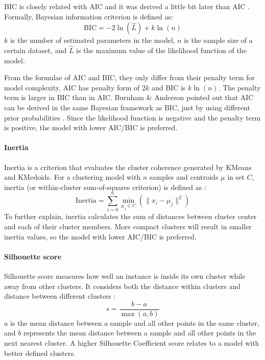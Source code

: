 \documentclass[a4paper]{article}
\begin{document}
BIC is closely related with AIC and it was derived a little bit later than AIC \cite{BIC}. Formally, Bayesian information criterion is defined as:
\begin{equation}
    \text{BIC}=-2\ln(\hat{L})+k\ln(n)
    \label{Eq: BIC}
\end{equation}
\noindent \(k\) is the number of estimated parameters in the model, \(n\) is the sample size of a certain dataset, and \(\hat{L}\) is the maximum value of the likelihood function of the model.

From the formulae of AIC and BIC, they only differ from their penalty term for model complexity, AIC has penalty form of \(2k\) and BIC is \(k\ln(n)\). The penalty term is larger in BIC than in AIC. Burnham \& Anderson pointed out that AIC can be derived in the same Bayesian framework as BIC, just by using different prior probabilities \cite{AIC_BIC_comparison}\cite{AIC_BIC_book}. Since the likelihood function is negative and the penalty term is positive, the model with lower AIC/BIC is preferred.

\paragraph{Inertia}
Inertia is a criterion that evaluates the cluster coherence generated by KMeans and KMedoids. For a clustering model with \(n\) samples and centroids \(\mu\) in set \(C\), inertia (or within-cluster sum-of-squares criterion) is defined as \cite{scikit-learn}:
\begin{equation}
    \text{Inertia}=\sum_{i=0}^{n}\min_{\mu_{j} \in C} \left( \parallel x_i - \mu_j\parallel^2 \right)
    \label{Eq: inertia}
\end{equation}
\noindent To further explain, inertia calculates the sum of distances between cluster center and each of their cluster members. More compact clusters will result in smaller inertia values, so the model with lower AIC/BIC is preferred.

\paragraph{Silhouette score}
Silhouette score measures how well an instance is inside its own cluster while away from other clusters. It considers both the distance within clusters and distance between different clusters \cite{scikit-learn}:
\begin{equation}
    s = \frac{b-a}{\max(a, b)}
    \label{Eq: Silhouette score}
\end{equation}
\noindent \(a\) is the mean distance between a sample and all other points in the same cluster, and \(b\) represents the mean distance between a sample and all other points in the next nearest cluster. A higher Silhouette Coefficient score relates to a model with better defined clusters. 
\end{document}
